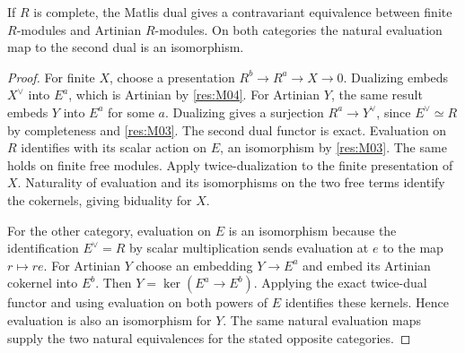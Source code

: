 \begin{theorem}\label{res:M05}
If $R$ is complete, the Matlis dual gives a contravariant equivalence
between finite $R$-modules and Artinian $R$-modules. On both categories
the natural evaluation map to the second dual is an isomorphism.
\end{theorem}
\begin{proof}
For finite $X$, choose a presentation $R^b\to R^a\to X\to0$.
Dualizing embeds $X^\vee$ into $E^a$, which is Artinian by
\ref{res:M04}. For Artinian $Y$, the same result embeds $Y$ into $E^a$
for some $a$. Dualizing gives a surjection $R^a\to Y^\vee$, since
$E^\vee\simeq R$ by completeness and \ref{res:M03}. The second dual
functor is exact. Evaluation on $R$ identifies with its scalar action
on $E$, an isomorphism by \ref{res:M03}. The same holds on finite free
modules. Apply twice-dualization to the finite presentation of $X$.
Naturality of evaluation and its isomorphisms on the two free terms
identify the cokernels, giving biduality for $X$.

For the other category, evaluation on $E$ is an isomorphism because the
identification $E^\vee=R$ by scalar multiplication sends evaluation
at $e$ to the map $r\mapsto re$. For Artinian $Y$ choose an embedding
$Y\to E^a$ and embed its Artinian cokernel into $E^b$. Then
$Y=\ker(E^a\to E^b)$. Applying the exact twice-dual functor and using
evaluation on both powers of $E$ identifies these kernels. Hence
evaluation is also an isomorphism for $Y$. The same natural evaluation
maps supply the two natural equivalences for the stated opposite
categories.
\end{proof}

